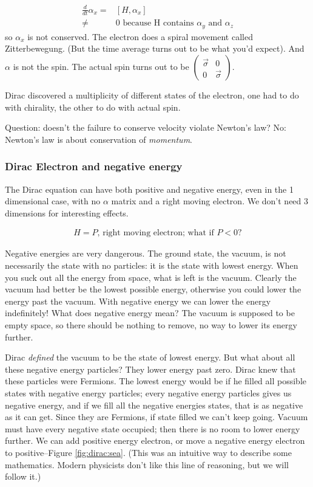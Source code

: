 \documentclass[]{article}
\begin{document}
\begin{align*}
	\frac{d}{dt} \alpha_x=&[H,\alpha_x]\\
	 \ne& 0 \text{ because H contains $\alpha_y$ and $\alpha_z$}
\end{align*}
so $\alpha_x$ is not conserved. The electron does a spiral movement called Zitterbewegung. (But the time average turns out to be what you'd expect). And $\alpha$ is not the spin. The actual spin turns out to be $\begin{pmatrix}
	\vec{\sigma}&0 \\
	0&\vec{\sigma}
\end{pmatrix}$.

Dirac discovered a multiplicity of different states of the electron, one had to do with chirality, the other to do with actual spin.

Question: doesn't the failure to conserve velocity violate Newton's law? No: Newton's law is about conservation of \emph{momentum}.

\subsubsection{Dirac Electron  and negative energy}

The Dirac equation can have both positive and negative energy, even in the 1 dimensional case, with no $\alpha$ matrix and a right moving electron. We don't need 3 dimensions for interesting effects.

\begin{align*}
	H=P \text{, right moving electron; what if $P<0$?}
\end{align*} 

Negative energies are very dangerous. The ground state, the vacuum, is not necessarily the state with no particles: it is the state with lowest energy. When you suck out all the energy from space, what is left is the vacuum. Clearly the vacuum had better be the lowest possible energy, otherwise you could lower the energy past the vacuum. With negative energy we can lower the energy indefinitely! What does negative energy mean? The vacuum is supposed to be empty space, so there should be nothing to remove, no way to lower its energy further.

Dirac \emph{defined} the vacuum to be the state of lowest energy. But what about all these negative energy particles? They lower energy past zero. Dirac knew that these particles were Fermions. The lowest energy would be if he filled all possible states with negative energy particles; every negative energy particles gives us negative energy, and if we fill all the negative energies states, that is as negative as it can get. Since they are Fermions, if state filled we can't keep going. Vacuum must have every negative state occupied; then there is no room to lower energy further.  We can add positive energy electron, or move a negative energy electron to positive--Figure \ref{fig:dirac:sea}. (This was an intuitive way to describe some mathematics. Modern physicists don't like this line of reasoning, but we will follow it.)
\end{document}
